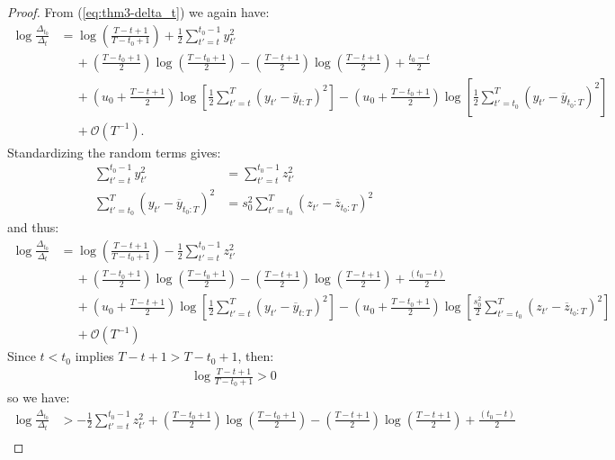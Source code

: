 \documentclass{article}
\begin{document}
\begin{proof}
From (\ref{eq:thm3-delta_t}) we again have:
\begin{align*}
    \log \frac{\Delta_{t_0}}{\Delta_t} &= \log \left(\frac{T - t + 1}{T - t_0 +1} \right) + \frac{1}{2} \sum_{t' = t}^{t_0 - 1} y_{t'}^2 \\
    &\quad\: + \left(\frac{T - t_0 + 1}{2}\right) \log\left(\frac{T-t_0+1}{2}\right) - \left(\frac{T - t + 1}{2}\right) \log\left(\frac{T-t+1}{2}\right) + \frac{t_0-t}{2} \\
    &\quad\: + \left(u_0 + \frac{T - t +1}{2}\right)\log\left[ \frac{1}{2}\sum_{t'=t}^T (y_{t'} - \overline{y}_{t:T})^2 \right]  - \left(u_0 + \frac{T - t_0 +1}{2}\right)\log\left[\frac{1}{2}\sum_{t'=t_0}^T (y_{t'} - \overline{y}_{t_0:T})^2 \right] \\
    &\quad\: + \mathcal{O}(T^{-1}).
\end{align*}
Standardizing the random terms gives:
\begin{align*}
    \sum_{t' = t}^{t_0 - 1} y_{t'}^2 &= \sum_{t' = t}^{t_0 - 1} z_{t'}^2 \\
    \sum_{t'=t_0}^T (y_{t'} - \overline{y}_{t_0:T})^2 &= s_0^2 \sum_{t'=t_0}^T  (z_{t'} - \overline{z}_{t_0:T})^2
\end{align*}
and thus:
\begin{align*}
    \log \frac{\Delta_{t_0}}{\Delta_t} &= \log \left(\frac{T - t + 1}{T - t_0 + 1} \right) - \frac{1}{2} \sum_{t' = t}^{t_0 - 1} z_{t'}^2 \\
    &\quad\: + \left(\frac{T - t_0 + 1}{2}\right) \log\left(\frac{T-t_0+1}{2}\right) - \left(\frac{T - t + 1}{2}\right) \log\left(\frac{T-t+1}{2}\right) + \frac{(t_0-t)}{2} \\
    &\quad\: + \left(u_0 + \frac{T - t +1}{2}\right)\log\left[ \frac{1}{2}\sum_{t'=t}^T (y_{t'} - \overline{y}_{t:T})^2 \right]- \left(u_0 + \frac{T - t_0 +1}{2}\right)\log\left[\frac{s_0^2}{2}\sum_{t'=t_0}^T  (z_{t'} - \overline{z}_{t_0:T})^2 \right] \\
    &\quad\: +  \mathcal{O}(T^{-1}) 
\end{align*}
Since $t < t_0$ implies $T-t + 1> T-t_0 +1$, then:
\begin{align*}
    \log\frac{T-t+1}{T-t_0+1} > 0
\end{align*}
so we have:
\begin{align*}
    \log \frac{\Delta_{t_0}}{\Delta_t} &> - \frac{1}{2} \sum_{t' = t}^{t_0 - 1} z_{t'}^2  + \left(\frac{T - t_0+1}{2}\right) \log\left(\frac{T-t_0+1}{2}\right) - \left(\frac{T - t+1}{2}\right) \log\left(\frac{T-t+1}{2}\right) + \frac{(t_0-t)}{2} \\

\end{align*}
\end{proof}
\end{document}
